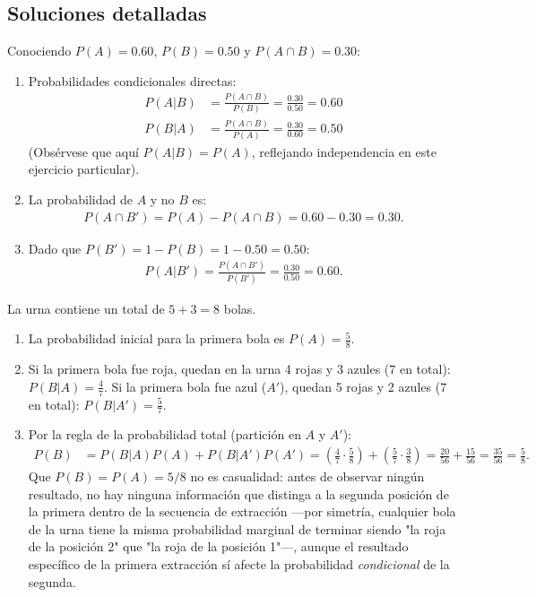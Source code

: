 \subsection*{Soluciones detalladas}

\begin{solproblema}[prob:8794f31]
	Conociendo $P(A)=0.60$, $P(B)=0.50$ y $P(A \cap B)=0.30$:
	\begin{enumerate}
		\item Probabilidades condicionales directas:
		\begin{align}
			P(A|B) &= \frac{P(A \cap B)}{P(B)} = \frac{0.30}{0.50} = 0.60 \\
			P(B|A) &= \frac{P(A \cap B)}{P(A)} = \frac{0.30}{0.60} = 0.50
		\end{align}
		(Obsérvese que aquí $P(A|B)=P(A)$, reflejando independencia en este ejercicio particular).

		\item La probabilidad de $A$ y no $B$ es:
		\begin{align}
			P(A \cap B') = P(A) - P(A \cap B) = 0.60 - 0.30 = 0.30.
		\end{align}

		\item Dado que $P(B') = 1 - P(B) = 1 - 0.50 = 0.50$:
		\begin{align}
			P(A|B') = \frac{P(A \cap B')}{P(B')} = \frac{0.30}{0.50} = 0.60.
		\end{align}
	\end{enumerate}
\end{solproblema}

\begin{solproblema}[prob:cf929e4]
	La urna contiene un total de $5 + 3 = 8$ bolas.
	\begin{enumerate}
		\item La probabilidad inicial para la primera bola es $P(A) = \frac{5}{8}$.
		\item Si la primera bola fue roja, quedan en la urna 4 rojas y 3 azules ($7$ en total): $P(B|A) = \frac{4}{7}$. Si la primera bola fue azul ($A'$), quedan 5 rojas y 2 azules ($7$ en total): $P(B|A') = \frac{5}{7}$.
		\item Por la regla de la probabilidad total (partición en $A$ y $A'$):
		\begin{align}
			P(B) &= P(B|A)P(A) + P(B|A')P(A') = \left(\frac{4}{7} \cdot \frac{5}{8}\right) + \left(\frac{5}{7} \cdot \frac{3}{8}\right) = \frac{20}{56} + \frac{15}{56} = \frac{35}{56} = \frac{5}{8}.
		\end{align}
		Que $P(B)=P(A)=5/8$ no es casualidad: antes de observar ningún resultado, no hay ninguna información que distinga a la segunda posición de la primera dentro de la secuencia de extracción —por simetría, cualquier bola de la urna tiene la misma probabilidad marginal de terminar siendo "la roja de la posición 2" que "la roja de la posición 1"—, aunque el resultado específico de la primera extracción sí afecte la probabilidad \emph{condicional} de la segunda.
	\end{enumerate}
\end{solproblema}

